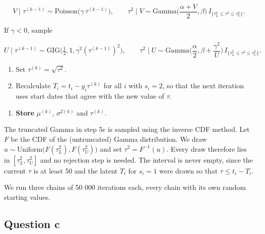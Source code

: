 \documentclass[
  12pt,
]{article}
\providecommand{\tightlist}{%
  \setlength{\itemsep}{0pt}\setlength{\parskip}{0pt}}
\begin{document}
\[
V \mid \tau^{(k-1)} \sim \text{Poisson}\big(\gamma \, \tau^{(k-1)}\big), \qquad \tau^2 \mid V \sim \text{Gamma}\Big(\frac{\alpha + V}{2}, \beta\Big) \, I_{\{\tau_L^2 \leq \tau^2 \leq \tau_U^2\}}.
\]

If \(\gamma < 0\), sample

\[
U \mid \tau^{(k-1)} \sim \text{GIG}\big(\tfrac{1}{2}, 1, \gamma^2 (\tau^{(k-1)})^2\big), \qquad \tau^2 \mid U \sim \text{Gamma}\Big(\frac{\alpha}{2}, \beta + \frac{\gamma^2}{U}\Big) \, I_{\{\tau_L^2 \leq \tau^2 \leq \tau_U^2\}}.
\]

\begin{enumerate}
\def\labelenumi{\alph{enumi}.}
\setcounter{enumi}{3}
\item
  Set \(\tau^{(k)} = \sqrt{\tau^2}\).
\item
  Recalculate \(T_i = t_i - y_i \tau^{(k)}\) for all \(i\) with
  \(s_i = 2\), so that the next iteration uses start dates that agree
  with the new value of \(\tau\).
\end{enumerate}

\begin{enumerate}
\def\labelenumi{\arabic{enumi}.}
\setcounter{enumi}{5}
\tightlist
\item
  \textbf{Store} \(\mu^{(k)}\), \(\sigma^{2(k)}\) and \(\tau^{(k)}\).
\end{enumerate}

The truncated Gamma in step 5c is sampled using the inverse CDF method.
Let \(F\) be the CDF of the (untruncated) Gamma distribution. We draw
\(u \sim \text{Uniform}\big(F(\tau_L^2), F(\tau_U^2)\big)\) and set
\(\tau^2 = F^{-1}(u)\). Every draw therefore lies in
\([\tau_L^2, \tau_U^2]\) and no rejection step is needed. The interval
is never empty, since the current \(\tau\) is at least 50 and the latent
\(T_i\) for \(s_i = 1\) were drawn so that \(\tau \leq t_i - T_i\).

We run three chains of 50 000 iterations each, every chain with its own
random starting values.

\subsection{Question c}\label{question-c}
\end{document}
